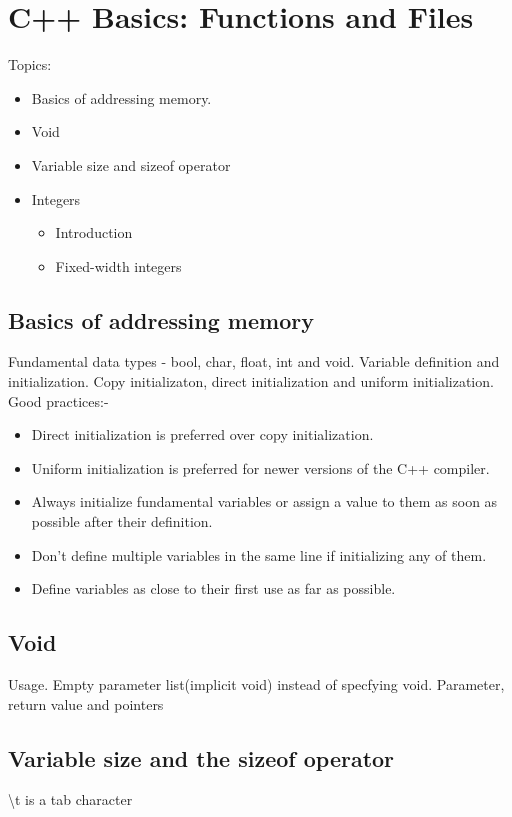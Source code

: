 \chapter{C++ Basics: Functions and Files}

Topics:
\begin{itemize}
    \item Basics of addressing memory.
    \item Void
    \item Variable size and sizeof operator
    \item Integers
    \begin{itemize}
        \item Introduction
        \item Fixed-width integers
    \end{itemize}
\end{itemize}

\section{Basics of addressing memory}
Fundamental data types - bool, char, float, int and void.
Variable definition and initialization. Copy initializaton, direct initialization and uniform initialization.
Good practices:-
\begin{itemize}
    \item Direct initialization is preferred over copy initialization.
    \item Uniform initialization is preferred for newer versions of the C++
    compiler.
    \item Always initialize fundamental variables or assign a value to them as
    soon as possible after their definition.
    \item Don't define multiple variables in the same line if initializing any
    of them.
    \item Define variables as close to their first use as far as possible.
\end{itemize}

\section{Void}
Usage. Empty parameter list(implicit void) instead of specfying void.
Parameter, return value and pointers

\section{Variable size and the sizeof operator}
\textbackslash t is a tab character

